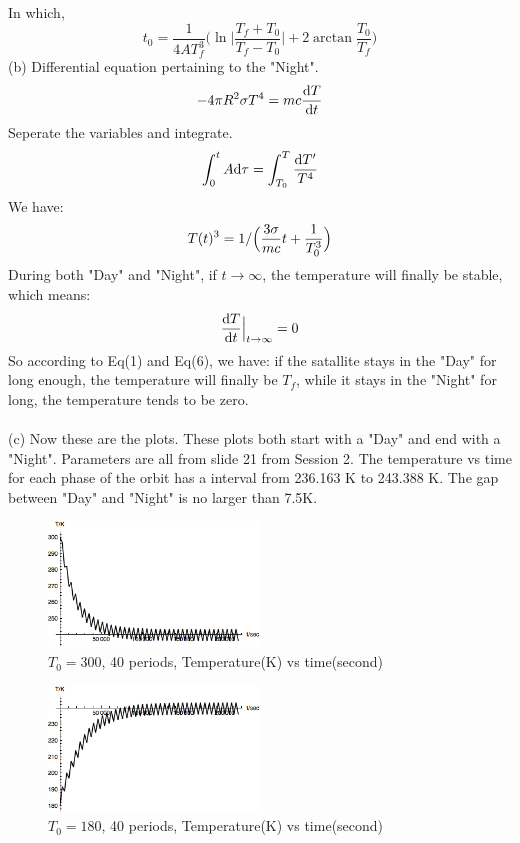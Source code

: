 \documentclass[a4paper]{article}
\begin{document}
In which, 
\begin{equation}
t_0 = 	\frac{1}{4AT_f^3}\Big(\ln \Big|\frac{T_f+T_0}{T_f-T_0}\Big|+2\arctan \frac{T_0}{T_f}\Big)
\end{equation}
(b) Differential equation pertaining to the "Night".
\begin{equation}
 -4\pi R^2\sigma T^4 = mc\frac{{\rm d}T}{{\rm d}t}
\end{equation}
Seperate the variables and integrate.
\begin{equation}
	\int_0^t A{\rm d}\tau = \int_{T_0}^{T} \frac{{\rm d}T'}{T^4}
\end{equation}
We have: 
\begin{equation}
	T(t)^3 = 1/\Big(\frac{3\sigma }{mc}\/t+\frac{1}{T_0^3}\Big)
\end{equation}
During both "Day" and "Night", if $t \rightarrow \infty$, the temperature will finally be stable, which means:
$$
\frac{{\rm d}T}{{\rm d}t}\Big|_{t \rightarrow \infty} = 0 
$$ 
So according to Eq(1) and Eq(6), we have: if the satallite stays in the "Day" for long enough, the temperature will finally be $T_f$, while it stays in the "Night" for long, the temperature tends to be zero. \\
\\
(c) Now these are the plots. These plots both start with a "Day" and end with a "Night". Parameters are all from slide 21 from Session 2. The temperature vs time for each phase of the orbit has a interval from 236.163 K to 243.388 K. The gap between "Day" and "Night" is no larger than 7.5K. 
\begin{figure}[hbtp]
\centering
\includegraphics[width=0.5\textwidth]{pic/300decend.png}
\caption{$T_0 = 300$, 40 periods, Temperature(K) vs time(second)} 
\label{300decend}
\end{figure}
\begin{figure}[hbtp]
\centering
\includegraphics[width=0.5\textwidth]{pic/180ascend.png}
\caption{$T_0 = 180$, 40 periods, Temperature(K) vs time(second)} 
\label{200ascend}
\end{figure}
\end{document}

